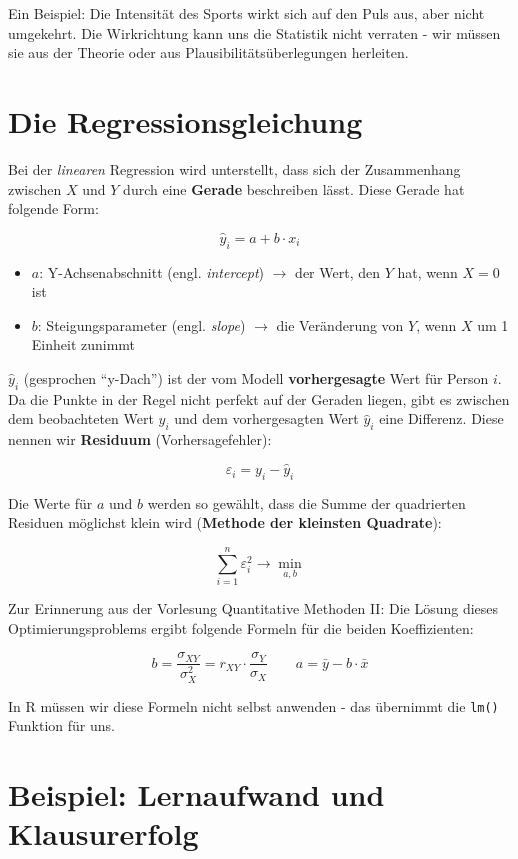 \documentclass[
]{book}
\providecommand{\tightlist}{%
  \setlength{\itemsep}{0pt}\setlength{\parskip}{0pt}}
\begin{document}
Ein Beispiel: Die Intensität des Sports wirkt sich auf den Puls aus, aber nicht umgekehrt. Die Wirkrichtung kann uns die Statistik nicht verraten - wir müssen sie aus der Theorie oder aus Plausibilitätsüberlegungen herleiten.

\section{Die Regressionsgleichung}\label{die-regressionsgleichung}

Bei der \emph{linearen} Regression wird unterstellt, dass sich der Zusammenhang zwischen \(X\) und \(Y\) durch eine \textbf{Gerade} beschreiben lässt. Diese Gerade hat folgende Form:

\[\hat{y}_i=a+b \cdot x_i\]

\begin{itemize}
\tightlist
\item
  \(a\): Y-Achsenabschnitt (engl. \emph{intercept}) \(\rightarrow\) der Wert, den \(Y\) hat, wenn \(X=0\) ist
\item
  \(b\): Steigungsparameter (engl. \emph{slope}) \(\rightarrow\) die Veränderung von \(Y\), wenn \(X\) um 1 Einheit zunimmt
\end{itemize}

\(\hat{y}_i\) (gesprochen ``y-Dach'') ist der vom Modell \textbf{vorhergesagte} Wert für Person \(i\). Da die Punkte in der Regel nicht perfekt auf der Geraden liegen, gibt es zwischen dem beobachteten Wert \(y_i\) und dem vorhergesagten Wert \(\hat{y}_i\) eine Differenz. Diese nennen wir \textbf{Residuum} (Vorhersagefehler):

\[\varepsilon_i=y_i - \hat{y}_i\]

Die Werte für \(a\) und \(b\) werden so gewählt, dass die Summe der quadrierten Residuen möglichst klein wird (\textbf{Methode der kleinsten Quadrate}):

\[\sum\limits _{i=1}^{n}\varepsilon^2_i \rightarrow \min_{a,b}\]

Zur Erinnerung aus der Vorlesung Quantitative Methoden II: Die Lösung dieses Optimierungsproblems ergibt folgende Formeln für die beiden Koeffizienten:

\[b=\frac{\sigma_{XY}}{\sigma^2_X} = r_{XY} \cdot \frac{\sigma_Y}{\sigma_X} \qquad a=\bar{y} - b \cdot \bar{x}\]

In R müssen wir diese Formeln nicht selbst anwenden - das übernimmt die \texttt{lm()} Funktion für uns.

\section{Beispiel: Lernaufwand und Klausurerfolg}\label{beispiel-lernaufwand-und-klausurerfolg}
\end{document}
